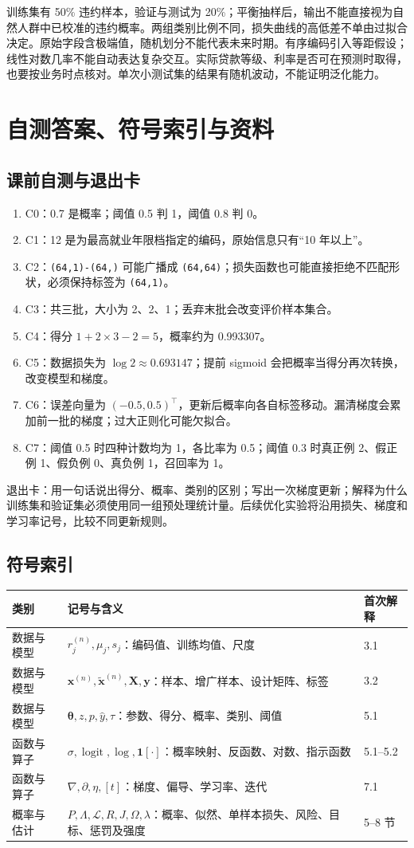\documentclass[UTF8,a4paper,11pt,fontset=fandol]{ctexart}
\begin{document}
训练集有 50\% 违约样本，验证与测试为 20\%；平衡抽样后，输出不能直接视为自然人群中已校准的违约概率。两组类别比例不同，损失曲线的高低差不单由过拟合决定。原始字段含极端值，随机划分不能代表未来时期。有序编码引入等距假设；线性对数几率不能自动表达复杂交互。实际贷款等级、利率是否可在预测时取得，也要按业务时点核对。单次小测试集的结果有随机波动，不能证明泛化能力。

\clearpage
\section{自测答案、符号索引与资料}
\subsection{课前自测与退出卡}
\begin{enumerate}
\item C0：0.7 是概率；阈值 0.5 判 1，阈值 0.8 判 0。
\item C1：12 是为最高就业年限档指定的编码，原始信息只有“10 年以上”。
\item C2：\texttt{(64,1)-(64,)} 可能广播成 \texttt{(64,64)}；损失函数也可能直接拒绝不匹配形状，必须保持标签为 \texttt{(64,1)}。
\item C3：共三批，大小为 2、2、1；丢弃末批会改变评价样本集合。
\item C4：得分 $1+2\times3-2=5$，概率约为 0.993307。
\item C5：数据损失为 $\log2\approx0.693147$；提前 sigmoid 会把概率当得分再次转换，改变模型和梯度。
\item C6：误差向量为 $(-0.5,0.5)^\top$，更新后概率向各自标签移动。漏清梯度会累加前一批的梯度；过大正则化可能欠拟合。
\item C7：阈值 0.5 时四种计数均为 1，各比率为 0.5；阈值 0.3 时真正例 2、假正例 1、假负例 0、真负例 1，召回率为 1。
\end{enumerate}
退出卡：用一句话说出得分、概率、类别的区别；写出一次梯度更新；解释为什么训练集和验证集必须使用同一组预处理统计量。后续优化实验将沿用损失、梯度和学习率记号，比较不同更新规则。
\subsection{符号索引}
\par\noindent\begin{tabularx}{\linewidth}{L{2.6cm}Y L{1.6cm}}
\toprule 类别 & 记号与含义 & 首次解释\\\midrule
数据与模型 & $r_j^{(n)},\mu_j,s_j$：编码值、训练均值、尺度 & 3.1\\
数据与模型 & $\mathbf x^{(n)},\tilde{\mathbf x}^{(n)},\mathbf X,\mathbf y$：样本、增广样本、设计矩阵、标签 & 3.2\\
数据与模型 & $\boldsymbol\theta,z,p,\hat y,\tau$：参数、得分、概率、类别、阈值 & 5.1\\
函数与算子 & $\sigma,\operatorname{logit},\log,\mathbf1[\cdot]$：概率映射、反函数、对数、指示函数 & 5.1--5.2\\
函数与算子 & $\nabla,\partial,\eta,[t]$：梯度、偏导、学习率、迭代 & 7.1\\
概率与估计 & $P,\Lambda,\mathcal L,R,J,\Omega,\lambda$：概率、似然、单样本损失、风险、目标、惩罚及强度 & 5--8 节\\\bottomrule
\end{tabularx}
\clearpage
\end{document}
